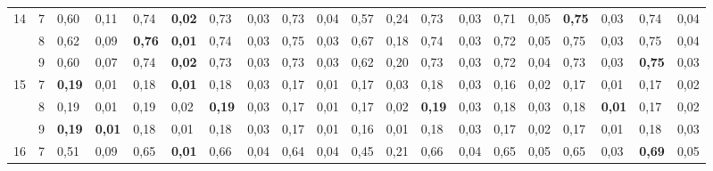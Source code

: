 \documentclass[conference]{IEEEtran}
\begin{document}
\begin{table*}[]
\begin{tabular}{|cl|ll|ll|ll|ll|ll|ll|ll|ll|ll|}
		\multicolumn{1}{|c|}{\multirow{3}{*}{14}} & 7 & \multicolumn{1}{l|}{0,60} & 0,11 & \multicolumn{1}{l|}{0,74} & \textbf{0,02} & \multicolumn{1}{l|}{0,73} & 0,03 & \multicolumn{1}{l|}{0,73} & 0,04 & \multicolumn{1}{l|}{0,57} & 0,24 & \multicolumn{1}{l|}{0,73} & 0,03 & \multicolumn{1}{l|}{0,71} & 0,05 & \multicolumn{1}{l|}{\textbf{0,75}} & 0,03 & \multicolumn{1}{l|}{0,74} & 0,04 \\ \cline{2-20} 
		\multicolumn{1}{|c|}{} & 8 & \multicolumn{1}{l|}{0,62} & 0,09 & \multicolumn{1}{l|}{\textbf{0,76}} & \textbf{0,01} & \multicolumn{1}{l|}{0,74} & 0,03 & \multicolumn{1}{l|}{0,75} & 0,03 & \multicolumn{1}{l|}{0,67} & 0,18 & \multicolumn{1}{l|}{0,74} & 0,03 & \multicolumn{1}{l|}{0,72} & 0,05 & \multicolumn{1}{l|}{0,75} & 0,03 & \multicolumn{1}{l|}{0,75} & 0,04 \\ \cline{2-20} 
		\multicolumn{1}{|c|}{} & 9 & \multicolumn{1}{l|}{0,60} & 0,07 & \multicolumn{1}{l|}{0,74} & \textbf{0,02} & \multicolumn{1}{l|}{0,73} & 0,03 & \multicolumn{1}{l|}{0,73} & 0,03 & \multicolumn{1}{l|}{0,62} & 0,20 & \multicolumn{1}{l|}{0,73} & 0,03 & \multicolumn{1}{l|}{0,72} & 0,04 & \multicolumn{1}{l|}{0,73} & 0,03 & \multicolumn{1}{l|}{\textbf{0,75}} & 0,03 \\ \hline
		\multicolumn{1}{|c|}{\multirow{3}{*}{15}} & 7 & \multicolumn{1}{l|}{\textbf{0,19}} & 0,01 & \multicolumn{1}{l|}{0,18} & \textbf{0,01} & \multicolumn{1}{l|}{0,18} & 0,03 & \multicolumn{1}{l|}{0,17} & 0,01 & \multicolumn{1}{l|}{0,17} & 0,03 & \multicolumn{1}{l|}{0,18} & 0,03 & \multicolumn{1}{l|}{0,16} & 0,02 & \multicolumn{1}{l|}{0,17} & 0,01 & \multicolumn{1}{l|}{0,17} & 0,02 \\ \cline{2-20} 
		\multicolumn{1}{|c|}{} & 8 & \multicolumn{1}{l|}{0,19} & 0,01 & \multicolumn{1}{l|}{0,19} & 0,02 & \multicolumn{1}{l|}{\textbf{0,19}} & 0,03 & \multicolumn{1}{l|}{0,17} & 0,01 & \multicolumn{1}{l|}{0,17} & 0,02 & \multicolumn{1}{l|}{\textbf{0,19}} & 0,03 & \multicolumn{1}{l|}{0,18} & 0,03 & \multicolumn{1}{l|}{0,18} & \textbf{0,01} & \multicolumn{1}{l|}{0,17} & 0,02 \\ \cline{2-20} 
		\multicolumn{1}{|c|}{} & 9 & \multicolumn{1}{l|}{\textbf{0,19}} & \textbf{0,01} & \multicolumn{1}{l|}{0,18} & 0,01 & \multicolumn{1}{l|}{0,18} & 0,03 & \multicolumn{1}{l|}{0,17} & 0,01 & \multicolumn{1}{l|}{0,16} & 0,01 & \multicolumn{1}{l|}{0,18} & 0,03 & \multicolumn{1}{l|}{0,17} & 0,02 & \multicolumn{1}{l|}{0,17} & 0,01 & \multicolumn{1}{l|}{0,18} & 0,03 \\ \hline
		\multicolumn{1}{|c|}{\multirow{3}{*}{16}} & 7 & \multicolumn{1}{l|}{0,51} & 0,09 & \multicolumn{1}{l|}{0,65} & \textbf{0,01} & \multicolumn{1}{l|}{0,66} & 0,04 & \multicolumn{1}{l|}{0,64} & 0,04 & \multicolumn{1}{l|}{0,45} & 0,21 & \multicolumn{1}{l|}{0,66} & 0,04 & \multicolumn{1}{l|}{0,65} & 0,05 & \multicolumn{1}{l|}{0,65} & 0,03 & \multicolumn{1}{l|}{\textbf{0,69}} & 0,05 \\ \cline{2-20} 

\end{tabular}
\end{table*}
\end{document}
